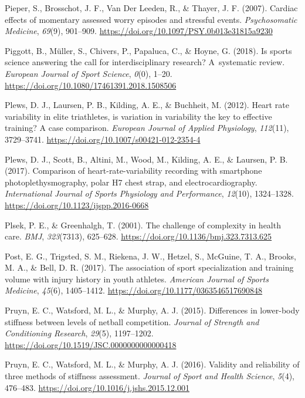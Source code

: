 \documentclass[man,floatsintext]{apa6}
\begin{document}
\leavevmode\hypertarget{ref-Pieper2007}{}%
Pieper, S., Brosschot, J. F., Van Der Leeden, R., \& Thayer, J. F. (2007). Cardiac effects of momentary assessed worry episodes and stressful events. \emph{Psychosomatic Medicine}, \emph{69}(9), 901--909. \url{https://doi.org/10.1097/PSY.0b013e31815a9230}

\leavevmode\hypertarget{ref-Piggott2018}{}%
Piggott, B., Müller, S., Chivers, P., Papaluca, C., \& Hoyne, G. (2018). Is sports science answering the call for interdisciplinary research? A~systematic review. \emph{European Journal of Sport Science}, \emph{0}(0), 1--20. \url{https://doi.org/10.1080/17461391.2018.1508506}

\leavevmode\hypertarget{ref-Plews2012}{}%
Plews, D. J., Laursen, P. B., Kilding, A. E., \& Buchheit, M. (2012). Heart rate variability in elite triathletes, is variation in variability the key to effective training? A case comparison. \emph{European Journal of Applied Physiology}, \emph{112}(11), 3729--3741. \url{https://doi.org/10.1007/s00421-012-2354-4}

\leavevmode\hypertarget{ref-Plews2017}{}%
Plews, D. J., Scott, B., Altini, M., Wood, M., Kilding, A. E., \& Laursen, P. B. (2017). Comparison of heart-rate-variability recording with smartphone photoplethysmography, polar H7 chest strap, and electrocardiography. \emph{International Journal of Sports Physiology and Performance}, \emph{12}(10), 1324--1328. \url{https://doi.org/10.1123/ijspp.2016-0668}

\leavevmode\hypertarget{ref-Plsek2001}{}%
Plsek, P. E., \& Greenhalgh, T. (2001). The challenge of complexity in health care. \emph{BMJ}, \emph{323}(7313), 625--628. \url{https://doi.org/10.1136/bmj.323.7313.625}

\leavevmode\hypertarget{ref-Post2017}{}%
Post, E. G., Trigsted, S. M., Riekena, J. W., Hetzel, S., McGuine, T. A., Brooks, M. A., \& Bell, D. R. (2017). The association of sport specialization and training volume with injury history in youth athletes. \emph{American Journal of Sports Medicine}, \emph{45}(6), 1405--1412. \url{https://doi.org/10.1177/0363546517690848}

\leavevmode\hypertarget{ref-Pruyn2015}{}%
Pruyn, E. C., Watsford, M. L., \& Murphy, A. J. (2015). Differences in lower-body stiffness between levels of netball competition. \emph{Journal of Strength and Conditioning Research}, \emph{29}(5), 1197--1202. \url{https://doi.org/10.1519/JSC.0000000000000418}

\leavevmode\hypertarget{ref-Pruyn2016}{}%
Pruyn, E. C., Watsford, M. L., \& Murphy, A. J. (2016). Validity and reliability of three methods of stiffness assessment. \emph{Journal of Sport and Health Science}, \emph{5}(4), 476--483. \url{https://doi.org/10.1016/j.jshs.2015.12.001}
\end{document}
